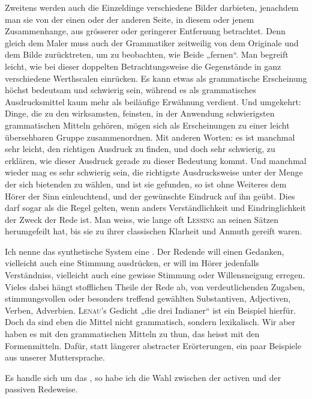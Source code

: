 Zweitens werden auch die Einzeldinge verschiedene Bilder darbieten, \label{fp.97} jenachdem man sie von der einen oder der anderen Seite, in diesem oder jenem Zusammenhange, aus grösserer oder geringerer Entfernung betrachtet. Denn gleich dem Maler muss auch der Grammatiker zeitweilig von dem Originale und dem Bilde zurücktreten, um zu beobachten, wie Beide „fernen“. Man begreift leicht, wie bei dieser doppelten Betrachtungsweise die Gegenstände in ganz verschiedene Werthscalen einrücken. Es kann etwas als grammatische Erscheinung höchst bedeutsam und schwierig sein, während es als grammatisches Ausdrucksmittel kaum mehr als beiläufige Erwähnung verdient. Und umgekehrt: Dinge, die zu den wirksamsten, feinsten, in der Anwendung schwierigsten grammatischen Mitteln gehören, mögen sich als Erscheinungen zu einer leicht übersehbaren Gruppe zusammenordnen. Mit anderen Worten: es ist manchmal sehr leicht, den richtigen Ausdruck zu finden, und doch sehr schwierig, zu erklären, wie dieser Ausdruck gerade zu dieser Bedeutung kommt. Und manchmal wieder mag es sehr schwierig sein, die richtigste Ausdrucksweise unter der Menge der sich bietenden zu wählen, und ist sie gefunden, so ist ohne Weiteres dem Hörer der Sinn einleuchtend, und der gewünschte Eindruck auf ihn geübt. Dies darf sogar als die Regel gelten, wenn anders Verständlichkeit und Eindringlichkeit der Zweck der Rede ist. Man weiss, wie lange oft \textsc{Lessing} an seinen Sätzen herumgefeilt hat, bis sie zu ihrer classischen Klarheit und Anmuth gereift waren.

\largerpage
Ich nenne das synthetische System eine . Der Redende will einen Gedanken, vielleicht auch eine Stimmung ausdrücken, er will im Hörer jedenfalls Verständniss, vielleicht auch eine gewisse Stimmung oder Willensneigung erregen. Vieles dabei hängt  stofflichen Theile der Rede ab, von verdeutlichenden Zugaben, stimmungsvollen oder besonders treffend gewählten Substantiven, Adjectiven, Verben, Adverbien. \textsc{Lenau}’s Gedicht „die drei Indianer“ ist ein Beispiel hierfür. Doch da sind eben die Mittel nicht grammatisch, sondern lexikalisch. Wir aber haben es mit den grammatischen Mitteln zu thun, das heisst mit den Formenmitteln. Dafür, statt längerer abstracter Erörterungen, ein paar Beispiele aus unserer Muttersprache.

\label{sp.95}

Es handle sich um das , so habe ich die Wahl zwischen der activen und der passiven Redeweise.

